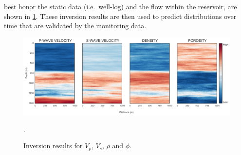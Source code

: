 best honor the static data (i.e.\ well-log) and the  flow within the
reservoir, are shown in \cref{fig:final_model}. These inversion results are then
used to predict  distributions over time that are validated by the
monitoring data.
\begin{figure}[!ht]
\centering
\includegraphics[width=1\textwidth]{fig/final_model.pdf}
\caption{Inversion results for $V_p$, $V_s$, $\rho$ and $\phi$.}
\label{fig:final_model}.
\end{figure}
